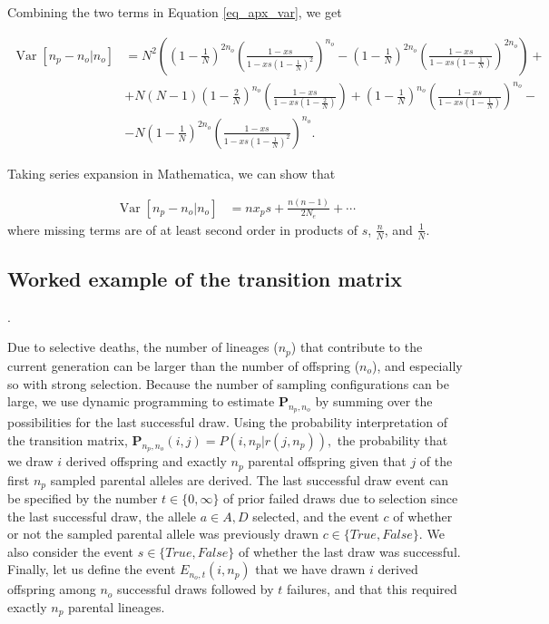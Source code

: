 \documentclass[review]{elsarticle}
\newcommand{\ikcomment}[1]{{\color{blue}{IK: #1}}}
\begin{document}
Combining the two terms in Equation \eqref{eq_apx_var}, we get


\newcommand{\vara}[1]{\left(1-\frac{#1}{N}\right)}
\newcommand{\varb}[1]{\left(\frac{1-xs}{1-xs #1}\right)}

\begin{equation}
  \begin{aligned}
    \operatorname{Var}[n_p-n_o | n_o] &=
    N^2\left( \vara{1}^{2n_o}\varb{\vara{1}^2}^{n_o}-\vara{1}^{2n_o}\varb{\vara{1}}^{2n_o} \right) + \\
    &+ N(N-1)\vara{2}^{n_o}\varb{\vara{2}} + \vara{1}^{n_o}\varb{\vara{1}}^{n_o} - \\
    &- N\vara{1}^{2n_o} \varb{\vara{1}^{2}}^{n_o}.
    \label{eq_exact_var}
  \end{aligned}
\end{equation}

Taking series expansion in Mathematica, we can show that  

\begin{equation}
  \begin{aligned}
    \operatorname{Var}[n_p-n_o | n_o] &= n x_p s + \frac{n (n-1)}{2 N_e}  + \cdots
    \label{eq_exact_var}
  \end{aligned}
\end{equation}
where missing terms are of at least second order in products of  $s$, $\frac{n}{N}$,  and $\frac{1}{N}.$

\subsection{Worked example of the transition matrix}
\label{subsec_apx_tpm}

\ikcomment{I've changed the event $r$ to $c$ in the main text (to avoid the unlikely confusing for
  $r$, the number of failures). This will need to be propagated in here, too}.

Due to selective deaths, the number of lineages ($n_p$) that contribute to the current generation
can be larger than the number of offspring ($n_o$), and especially so with strong selection. Because
the number of sampling configurations can be large, we use dynamic programming to estimate
$\mathbf{P}_{n_p,n_o}$ by summing over the possibilities for the last successful draw. Using the
probability interpretation of the transition matrix,
$\mathbf{P}_{n_p,n_o}(i,j) = P(i, n_p | r(j, n_p)),$ the probability that we draw $i$ derived
offspring and exactly $n_p$ parental offspring given that $j$ of the first $n_p$ sampled parental
alleles are derived. The last successful draw event can be specified by the number
$t \in \{0,\infty\}$ of prior failed draws due to selection since the last successful draw, the
allele $a \in {A, D}$ selected, and the event $c$ of whether or not the sampled parental allele was
previously drawn $c\in \{True, False\}$. We also consider the event $s \in \{True, False\}$ of
whether the last draw was successful. Finally, let us define the event $E_{n_o,t}(i,n_p)$ that we
have drawn $i$ derived offspring among $n_o$ successful draws followed by $t$ failures, and that
this required exactly $n_p$ parental lineages.
\end{document}
